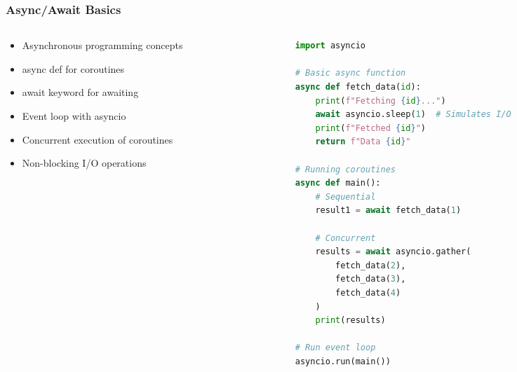 \begin{frame}[fragile]\frametitle{Async/Await Basics}
\begin{columns}
    \begin{column}[T]{0.5\linewidth}
      \begin{itemize}
        \item Asynchronous programming concepts
        \item async def for coroutines
        \item await keyword for awaiting
        \item Event loop with asyncio
        \item Concurrent execution of coroutines
        \item Non-blocking I/O operations
      \end{itemize}
    \end{column}
    \begin{column}[T]{0.5\linewidth}
      \begin{lstlisting}[language=python, basicstyle=\tiny]
import asyncio

# Basic async function
async def fetch_data(id):
    print(f"Fetching {id}...")
    await asyncio.sleep(1)  # Simulates I/O
    print(f"Fetched {id}")
    return f"Data {id}"

# Running coroutines
async def main():
    # Sequential
    result1 = await fetch_data(1)

    # Concurrent
    results = await asyncio.gather(
        fetch_data(2),
        fetch_data(3),
        fetch_data(4)
    )
    print(results)

# Run event loop
asyncio.run(main())
      \end{lstlisting}
    \end{column}
  \end{columns}
\end{frame}

